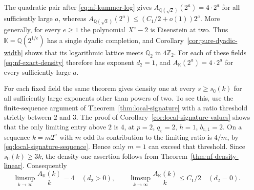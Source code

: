 \documentclass[11pt,letterpaper]{article}
\theoremstyle{definition}
\numberwithin{equation}{section}
\begin{document}
The quadratic pair after \eqref{eq:nf-kummer-log} gives
$A_{\mathbb Q(\sqrt2)}(2^a)=4\cdot2^a$ for all sufficiently large $a$,
whereas $A_{\mathbb Q(\sqrt3)}(2^a)\le(C_1/2+o(1))2^a$.
More generally, for every $e\ge1$ the polynomial $X^e-2$ is
Eisenstein at two. Thus $\mathbb K=\mathbb Q(2^{1/e})$ has a 
single dyadic completion, and Corollary~\ref{cor:pure-dyadic-width}
shows that its logarithmic lattice meets $\mathbb Q_2$ in
$4\mathbb Z_2$. For each of these fields \eqref{eq:nf-exact-density}
therefore has exponent $d_2=1$, and $A_{\mathbb K}(2^a)=4\cdot2^a$
for every sufficiently large $a$.

For each fixed field the same theorem gives density one at every
$s\ge s_0(k)$ for all sufficiently large exponents other than powers
of two. To see this, use the finite-sequence argument of
Theorem~\ref{thm:local-signature} with a ratio threshold strictly
between $2$ and $3$. The proof of
Corollary~\ref{cor:local-signature-values} shows that the only
limiting entry above $2$ is $4$, at $p=2$, $q_v=2$, $h=1$,
$b_{v,1}=2$. On a sequence $k=m2^a$ with $m$ odd its contribution
to the limiting ratio is $4/m$, by
\eqref{eq:local-signature-sequence}. Hence only $m=1$ can exceed
that threshold. Since $s_0(k)\ge3k$, the density-one assertion
follows from Theorem~\ref{thm:nf-density-linear}. Consequently
\[
 \limsup_{k\to\infty}\frac{A_{\mathbb K}(k)}{k}
 =4\quad(d_2>0),\qquad
 \limsup_{k\to\infty}\frac{A_{\mathbb K}(k)}{k}
 \le C_1/2\quad(d_2=0).
\]
\end{document}
